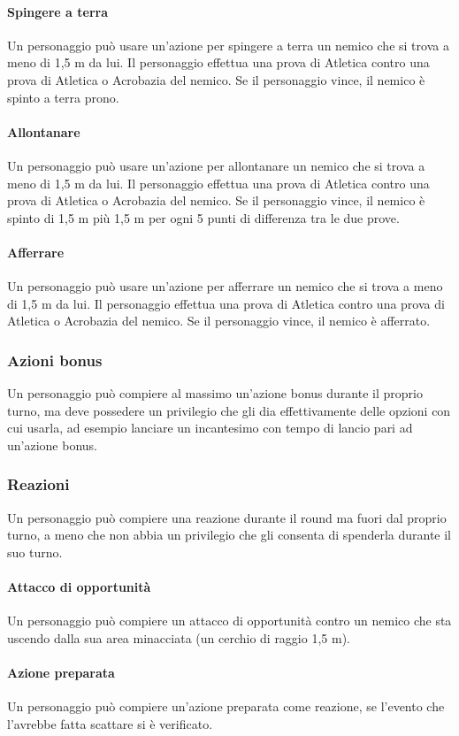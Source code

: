 \paragraph{Spingere a terra}
Un personaggio può usare un'azione per spingere a terra un nemico che si trova a meno di 1,5 m da lui. Il personaggio effettua una prova di Atletica contro una prova di Atletica o Acrobazia del nemico. Se il personaggio vince, il nemico è spinto a terra prono.\\
\paragraph{Allontanare}
Un personaggio può usare un'azione per allontanare un nemico che si trova a meno di 1,5 m da lui. Il personaggio effettua una prova di Atletica contro una prova di Atletica o Acrobazia del nemico. Se il personaggio vince, il nemico è spinto di 1,5 m più 1,5 m per ogni 5 punti di differenza tra le due prove.\\
\paragraph{Afferrare}
Un personaggio può usare un'azione per afferrare un nemico che si trova a meno di 1,5 m da lui. Il personaggio effettua una prova di Atletica contro una prova di Atletica o Acrobazia del nemico. Se il personaggio vince, il nemico è afferrato.\\

\subsubsection{Azioni bonus}
Un personaggio può compiere al massimo un'azione bonus durante il proprio turno, ma deve possedere un privilegio che gli dia effettivamente delle opzioni con cui usarla, ad esempio lanciare un incantesimo con tempo di lancio pari ad un'azione bonus.\\

\subsubsection{Reazioni}
Un personaggio può compiere una reazione durante il round ma fuori dal proprio turno, a meno che non abbia un privilegio che gli consenta di spenderla durante il suo turno.\\
\paragraph{Attacco di opportunità}
Un personaggio può compiere un attacco di opportunità contro un nemico che sta uscendo dalla sua area minacciata (un cerchio di raggio 1,5 m).\\
\paragraph{Azione preparata}
Un personaggio può compiere un'azione preparata come reazione, se l'evento che l'avrebbe fatta scattare si è verificato.\\